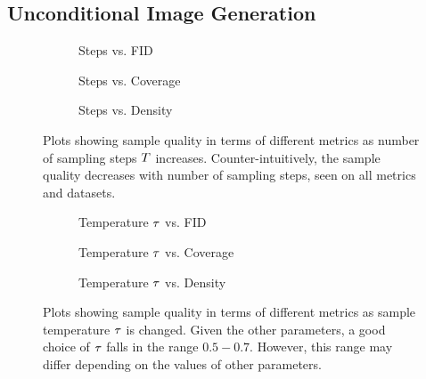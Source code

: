 \subsection{Unconditional Image Generation}
\label{subsec:evaluationUnconditional}

\begin{figure}
    \centering
    \begin{subfigure}[b]{0.33\textwidth}
        \centering
        \resizebox{\textwidth}{!}{
            
        }
        \caption{Steps vs. FID}
    \end{subfigure}
    \hfill
    \begin{subfigure}[b]{0.33\textwidth}
        \centering
        \resizebox{\textwidth}{!}{
            
        }
        \caption{Steps vs. Coverage}
    \end{subfigure}
    \hfill
    \begin{subfigure}[b]{0.33\textwidth}
        \centering
        \resizebox{\textwidth}{!}{
            
        }
        \caption{Steps vs. Density}
    \end{subfigure}
    \caption{
        Plots showing sample quality in terms of different metrics as
        number of sampling steps $T$ increases. Counter-intuitively, the
        sample quality decreases with number of sampling steps, seen on
        all metrics and datasets.
    }
    \label{fig:step}
\end{figure}

\begin{figure}
    \begin{subfigure}[b]{0.33\textwidth}
        \centering
        \resizebox{\textwidth}{!}{
            
        }
        \caption{Temperature $\tau$ vs. FID}
    \end{subfigure}
    \hfill
    \begin{subfigure}[b]{0.33\textwidth}
        \centering
        \resizebox{\textwidth}{!}{
            
        }
        \caption{Temperature $\tau$ vs. Coverage}
    \end{subfigure}
    \hfill
    \begin{subfigure}[b]{0.33\textwidth}
        \centering
        \resizebox{\textwidth}{!}{
            
        }
        \caption{Temperature $\tau$ vs. Density}
    \end{subfigure}
    \caption{
        Plots showing sample quality in terms of different metrics as sample
        temperature $\tau$ is changed. Given the other parameters, a good choice
        of $\tau$ falls in the range $0.5-0.7$. However, this range may
        differ depending on the values of other parameters.
    }
    \label{fig:temp}
\end{figure}

